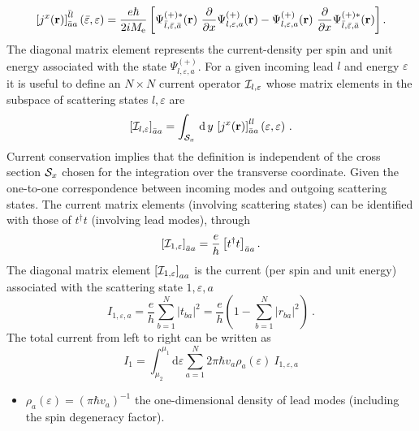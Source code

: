 \documentclass[a4paper,10pt]{article}
\newcommand{\br}{\mathbf{r}}
\newcommand{\dif}{\mathrm{d}}
\def\ba{\bar{a}}
\def\bl{\bar{l}}
\def\Me{M_{\rm e}}
\def\r]{\right]}
\def\l[{\left[}
\begin{document}
\begin{equation}\label{j0matrix}
\l[j^{x}(\br)\r]_{\ba a}^{\bl l}(\bar{\varepsilon},\varepsilon)=
\frac{e\hbar}{2i\Me}
\l[
\Psi_{\bar{l},\bar{\varepsilon},\bar{a}}^{(+)*}(\br) 
\ \frac{\partial}{\partial x}\Psi_{l,\varepsilon,a}^{(+)}(\br) -
\Psi_{l,\varepsilon,a}^{(+)}(\br) \ \frac{\partial}{\partial x}\Psi_{\bar{l},
\bar{\varepsilon},\bar{a}}^{(+)*}(\br) 
\r].
\end{equation}
%
The diagonal matrix element represents the 
current-density per spin and unit energy associated with the state $\Psi_{l,\varepsilon,a}^{(+)}$. 
For a given incoming lead $l$ and energy $\varepsilon$ it is useful to define an $N \times N$ current operator ${\cal I}_{l,\varepsilon}$ whose matrix elements in the subspace of scattering states $l,\varepsilon$ are 
\begin{equation}
\l[{\cal I}_{l,\varepsilon}\r]_{\ba a} = \int_{{\cal S}_x}\,\dif\,y\,
\l[j^{x}(\br)\r]_{\ba a}^{l l}(\varepsilon,\varepsilon) \ .
\end{equation}
% 
Current conservation implies that the definition is independent of the cross section ${\cal S}_x$ chosen for the integration over the transverse coordinate. Given the one-to-one correspondence between incoming modes and outgoing scattering states. The current matrix elements (involving scattering states) can be identified with those of $t^\dagger t$ (involving lead modes), through 
\begin{equation}
\label{tt_vs_I}
\left[{\cal I}_{1,\varepsilon}\right]_{\ba a}=\frac{e}{h}\left[t^{\dagger}t\right]_{\ba a}.
\end{equation}
%
The diagonal matrix element $\l[{\cal I}_{1,\varepsilon}\r]_{a a}$
is the current (per spin and unit energy) associated with the scattering state $1,\varepsilon,a$
\begin{equation}
\label{eq:I0state}
I_{1,\varepsilon,a} = 
\frac{e}{h} \sum_{b=1}^{N} |t_{ba}|^2
= \frac{e}{h} 
\left(1-\sum_{b=1}^{N} |r_{ba}|^2\right) \ .
\end{equation}
%
The total current from left to right can be written as
\begin{equation}
\label{eq:I0}
I_1 = \int_{\mu_2}^{\mu_1} \dif \varepsilon \sum_{a=1}^{N} 2\pi\hbar v_{a} \rho_{a}(\varepsilon) \ I_{1,\varepsilon,a} 
\end{equation}

%  
\begin{itemize}

\item $\rho_{a}(\varepsilon)=(\pi \hbar v_a)^{-1}$ the 
one-dimensional density of lead modes (including the spin degeneracy factor).  

\end{itemize}
\end{document}
